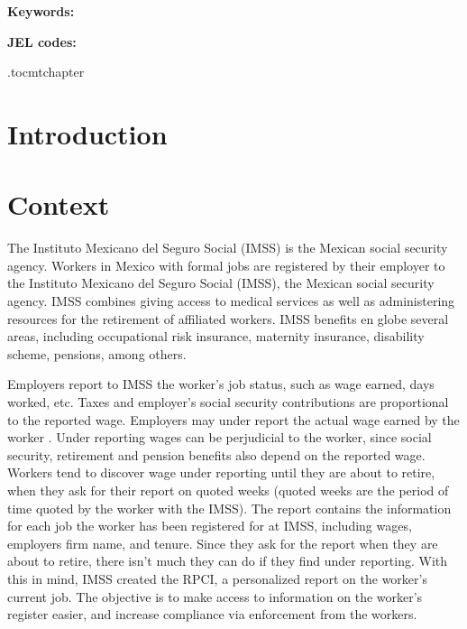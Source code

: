 \documentclass[oneside,11pt]{article}
\begin{document}


\maketitle
\thispagestyle{empty}
\begin{abstract}


\end{abstract}

\vspace{.3in}

\textbf{Keywords: }

\textbf{JEL codes:}

\newpage

\etocdepthtag.toc{mtchapter}



\section{Introduction}


\section{Context} \label{context}
The Instituto Mexicano del Seguro Social (IMSS) is the Mexican social security agency.  Workers in Mexico with formal jobs are registered by their employer to the Instituto Mexicano del Seguro Social (IMSS), the Mexican social security agency. IMSS combines giving access to medical services as well as administering resources for the retirement of affiliated workers. IMSS benefits en globe several areas, including occupational risk insurance, maternity insurance, disability scheme, pensions, among others.

Employers report to IMSS the worker's job status, such as wage earned, days worked, etc. Taxes and employer's social security contributions are proportional to the reported wage.  Employers may under report the actual wage earned by the worker \citep{kumler2020enlisting}. Under reporting wages can be perjudicial to the worker, since social security, retirement and pension benefits also depend on the reported wage. Workers tend to discover wage under reporting until they are about to retire, when they ask for their report on quoted weeks (quoted weeks are the period of time quoted by the worker with the IMSS). The report contains the information for each job the worker has been registered for at IMSS, including wages, employers firm name, and tenure. Since they ask for the report when they are about to retire, there isn't much they can do if they find under reporting. With this in mind, IMSS created the RPCI, a personalized report on the worker's current job. The objective is to make access to information on the worker's register easier, and increase compliance via enforcement from the workers.
\end{document}
